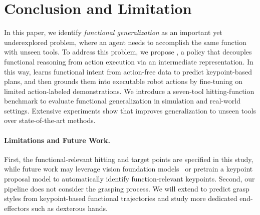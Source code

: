 \section{Conclusion and Limitation}
\label{sec:conclusion}
In this paper, we identify \textit{functional generalization} as an important yet underexplored problem, where an agent needs to accomplish the same function with unseen tools. 
To address this problem, we propose \algoname{}, a policy that decouples functional reasoning from action execution via an intermediate representation. 
In this way, \algoname{} learns functional intent from action-free data to predict keypoint-based plans, and then grounds them into executable robot actions by fine-tuning on limited action-labeled demonstrations.
We introduce a seven-tool hitting-function benchmark to evaluate functional generalization in simulation and real-world settings. 
Extensive experiments show that \algoname{} improves generalization to unseen tools over state-of-the-art methods. 

\paragraph{Limitations and Future Work.}
First, the functional-relevant hitting and target points are specified in this study, while future work may leverage vision foundation models~\cite{yuan2025robopoint} or pretrain a keypoint proposal model to automatically identify function-relevant keypoints. 
Second, our pipeline does not consider the grasping process. 
We will extend \algoname{} to predict grasp styles from keypoint-based functional trajectories and study more dedicated end-effectors such as dexterous hands.



	
